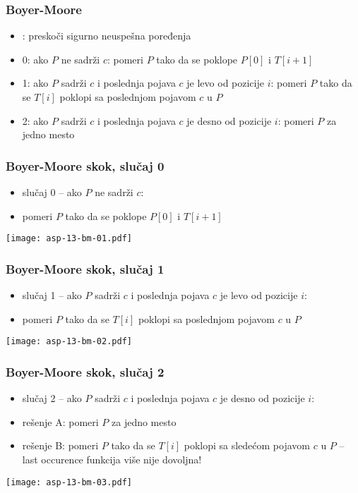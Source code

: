 \documentclass[compress,aspectratio=169]{beamer}
\begin{document}
\begin{frame}[fragile]
  \frametitle{Boyer-Moore}
  \begin{itemize}
    \item {}: preskoči sigurno neuspešna poređenja
    \item 0: ako $P$ ne sadrži $c$: pomeri $P$ tako da se poklope $P[0]$ i $T[i+1]$
    \item 1: ako $P$ sadrži $c$ i poslednja pojava $c$ je levo od pozicije $i$: pomeri $P$ tako da se $T[i]$ poklopi sa
    poslednjom pojavom $c$ u $P$
    \item 2: ako $P$ sadrži $c$ i poslednja pojava $c$ je desno od pozicije $i$: pomeri $P$ za jedno mesto
  \end{itemize}
\end{frame}

\begin{frame}[fragile]
  \frametitle{Boyer-Moore skok, slučaj 0}
  \begin{itemize}
    \item slučaj 0 -- ako $P$ ne sadrži $c$: 
    \item pomeri $P$ tako da se poklope $P[0]$ i $T[i+1]$
  \end{itemize}
  \begin{center}
    \texttt{[image: asp-13-bm-01.pdf]}
  \end{center}
\end{frame}

\begin{frame}[fragile]
  \frametitle{Boyer-Moore skok, slučaj 1}
  \begin{itemize}
    \item slučaj 1 -- ako $P$ sadrži $c$ i poslednja pojava $c$ je levo od pozicije $i$: 
    \item pomeri $P$ tako da se $T[i]$ poklopi sa poslednjom pojavom $c$ u $P$
  \end{itemize}
  \begin{center}
    \texttt{[image: asp-13-bm-02.pdf]}
  \end{center}
\end{frame}

\begin{frame}[fragile]
  \frametitle{Boyer-Moore skok, slučaj 2}
  \begin{itemize}
    \item slučaj 2 -- ako $P$ sadrži $c$ i poslednja pojava $c$ je desno od pozicije $i$: 
    \item rešenje A: pomeri $P$ za jedno mesto
    \item rešenje B: pomeri $P$ tako da se $T[i]$ poklopi sa sledećom pojavom $c$ u $P$ -- last occurence funkcija više nije dovoljna!
  \end{itemize}
  \begin{center}
    \texttt{[image: asp-13-bm-03.pdf]}
  \end{center}
\end{frame}
\end{document}
